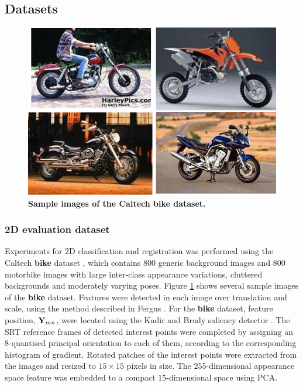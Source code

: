 \subsection{Datasets}

\begin{figure}[t]
	\centering
	\includegraphics[width=0.8\linewidth]{./fig/reg/bike.png}
	\caption{\textbf{Sample images of the Caltech \textbf{bike} dataset.}}
	\label{fig/reg/bike}
\end{figure}

\subsubsection{2D evaluation dataset}
Experiments for 2D classification and registration was performed using the Caltech \textbf{bike} dataset \cite{ComputationalVisionLab2001}, which contains 800 generic background images and 800 motorbike images with large inter-class appearance variations, cluttered backgrounds and moderately varying poses. Figure \ref{fig/reg/bike} shows several sample images of the \textbf{bike} dataset.  
Features were detected in each image over translation and scale, using the method described in Fergus \etal \cite{Fergus2007}. 
For the \textbf{bike} dataset, feature position, $\mathbf{Y}_{mn}$, were located using the Kadir and Brady saliency detector \cite{Kadir2001}. The SRT reference frames of detected interest points were completed by assigning an $8$-quantised principal orientation to each of them, according to the corresponding histogram of gradient. 
Rotated patches of the interest points were extracted from the images and resized to $15 \times 15$ pixels in size.
The $255$-dimensional appearance space feature was embedded to a compact $15$-dimensional space using PCA. 

